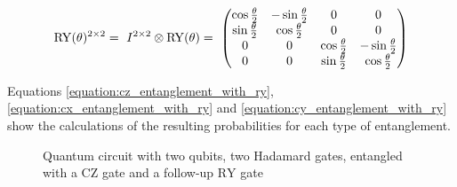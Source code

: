  \begin{equation}
     \centering
     \begin{split}
        \mathrm{RY}(\theta)^{2\times2} =\ I^{2\times2}\otimes\mathrm{RY}(\theta) =\  \begin{pmatrix}
        \cos{\frac{\theta}{2}} & -\sin{\frac{\theta}{2}} & 0 & 0\\
        \sin{\frac{\theta}{2}} & \cos{\frac{\theta}{2}} & 0 & 0 \\
        0 & 0 & \cos{\frac{\theta}{2}} & -\sin{\frac{\theta}{2}}\\
        0 & 0 & \sin{\frac{\theta}{2}} & \cos{\frac{\theta}{2}}\\
    \end{pmatrix}\\
     \end{split}
     \label{equation:2_x_2_ry}
 \end{equation}

Equations \ref{equation:cz_entanglement_with_ry}, \ref{equation:cx_entanglement_with_ry} and \ref{equation:cy_entanglement_with_ry} show the calculations of the resulting probabilities for each type of entanglement.

\begin{figure}[!ht]
    \centering
    \caption{Quantum circuit with two qubits, two Hadamard gates, entangled with a $\mathrm{CZ}$ gate and a follow-up $\mathrm{RY}$ gate}
    \label{fig:circuit_cz_entangled_ry_gate}
\end{figure}

